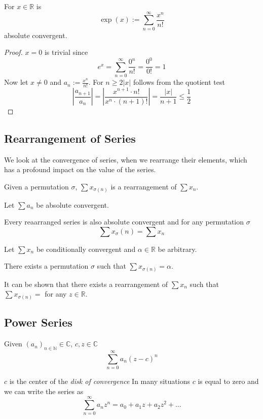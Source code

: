 \begin{proposition}
   For \(x \in \mathbb{R}\) is
   \[\exp(x) := \sum_{n=0}^\infty \frac{x^n}{n!}\]
   absolute convergent.
\end{proposition}
\begin{proof}
   \(x = 0\) is trivial since
   \[e^x = \sum_{n=0}^\infty \frac{0^n}{n!} = \frac{0^0}{0!} = 1\]
   Now let \(x \neq 0\) and \(a_n := \frac{x^n}{n!}\).
   For \(n \geq 2\lvert x\rvert\) follows from the quotient test
   \[\left\lvert \frac{a_{n+1}}{a_n} \right\rvert = \left\lvert \frac{x^{n+1} \cdot n!}{x^n \cdot (n+1)!}\right\rvert = \frac{\lvert x\rvert}{n+1} \leq \frac{1}{2}\]
\end{proof}

\subsection{Rearrangement of Series}
We look at the convergence of series, when we rearrange their elements, which has a profound impact on the value of the series.
\begin{definition}
   Given a permutation \(\sigma\), \(\sum x_{\sigma(n)}\) is a rearrangement of \(\sum x_n\).
\end{definition}

\begin{theorem}\label{thm:rearrange_series}
   Let \(\sum a_n\) be absolute convergent.

   Every reaarranged series is also absolute convergent and for any permutation \(\sigma\)
   \[\sum x_\sigma(n) = \sum x_n\]
\end{theorem}

\begin{proposition}\label{pro:riemann_rearrang}
   Let \(\sum x_n\) be conditionally convergent and \(\alpha \in \mathbb{R}\) be arbitrary.

   There exists a permutation \(\sigma\) such that \(\sum x_{\sigma(n)} = \alpha\).
\end{proposition}
\begin{remark}
   It can be shown that there exists a rearrangement of \(\sum x_n\) such that \(\sum x_{\sigma(n)} = \) for any \(z \in \mathbb{R}\).
\end{remark}

\subsection{Power Series}
\begin{definition}\label{def:power_series}
   Given \((a_n)_{n \in \mathbb{N}} \in \mathbb{C}\), \(c, z \in \mathbb{C}\)
   \[\sum_{n=0}^\infty a_n (z - c)^n\]
\end{definition}
\begin{remark}
   \(c\) is the center of the \textit{disk of convergence}
   In many situations \(c\) is equal to zero and we can write the series as
   \[\sum_{n=0}^\infty a_n z^n = a_0 + a_1z + a_2z^2 + \ldots\]
\end{remark}

